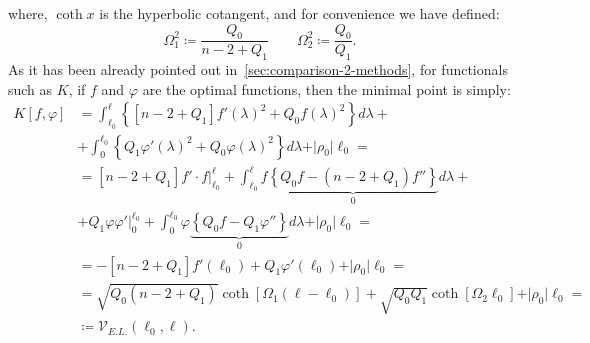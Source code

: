 where, \(\coth x\) is the hyperbolic cotangent, and for convenience we have defined:
\[
\Omega_1^2 \coloneqq \frac{Q_0}{n - 2 + Q_1} \quad \quad  \Omega_2^2 \coloneqq \frac{Q_0}{Q_1}.
\]
As it has been already pointed out in~\ref{sec:comparison-2-methods}, for functionals such as \(K\), if \(f\) and \(\varphi\) are the optimal functions, then the minimal point is simply:
\begin{align*}
    K[f, \varphi] &= \int_{\ell_0}^{\ell}\left\{\left[n - 2 + Q_1\right] f'(\lambda)^2  + Q_0 f(\lambda)^2\right\}d\lambda + \\
    &+\int_{0}^{\ell_0}\left\{Q_1 \varphi'(\lambda)^2  + Q_0 \varphi(\lambda)^2\right\}d\lambda + \vert\rho_0\vert\ell_0 = \\
    &= \left[n - 2 + Q_1\right] f'\cdot f\Big\vert_{\ell_0}^{\ell} + \int_{\ell_0}^{\ell} f\underbrace{\left\{Q_0f - \left(n - 2 + Q_1\right)f''\right\}}_{0} d\lambda + \\ &+ Q_1\varphi\varphi'\Big\vert_0^{\ell_0} + \int_{0}^{\ell_0} \varphi\underbrace{\left\{Q_0f -  Q_1\varphi''\right\}}_{0} d\lambda + \vert\rho_0\vert\ell_0 =\\
    &=-\left[n - 2 + Q_1\right] f'(\ell_0) +Q_1\varphi'(\ell_0) + \vert\rho_0\vert\ell_0 = \\
    &= \sqrt{Q_0(n - 2 + Q_1)}\coth\left[\Omega_1(\ell- \ell_0)\right] + \sqrt{Q_0Q_1}\coth\left[\Omega_2\ell_0\right] + \vert \rho_0\vert\ell_0 = \\
    &\coloneqq \mathcal{V}_{E.L.}(\ell_0, \ell).
\end{align*}

